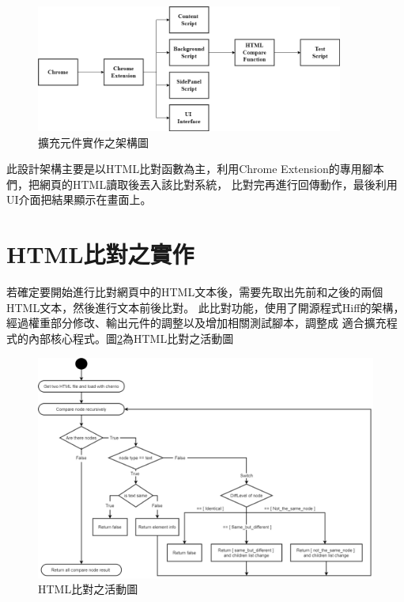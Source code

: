 \begin{figure}[H]
    \centering
    \includegraphics[width=0.9\textwidth]{picture/ch3-systemStucture.png}
    \caption{擴充元件實作之架構圖}
    \label{f3.1}
\end{figure}

此設計架構主要是以HTML比對函數為主，利用Chrome Extension的專用腳本們，把網頁的HTML讀取後丟入該比對系統，
比對完再進行回傳動作，最後利用UI介面把結果顯示在畫面上。

\section{HTML比對之實作}\label{s3.2}
\indent

若確定要開始進行比對網頁中的HTML文本後，需要先取出先前和之後的兩個HTML文本，然後進行文本前後比對。
此比對功能，使用了開源程式Hiff的架構，經過權重部分修改、輸出元件的調整以及增加相關測試腳本，調整成
適合擴充程式的內部核心程式。圖\ref{f3.2}為HTML比對之活動圖

\begin{figure}[H]
    \centering
    \includegraphics[width=1.0\textwidth]{picture/ch3-activity diagram.png}
    \caption{HTML比對之活動圖}
    \label{f3.2}
\end{figure}

